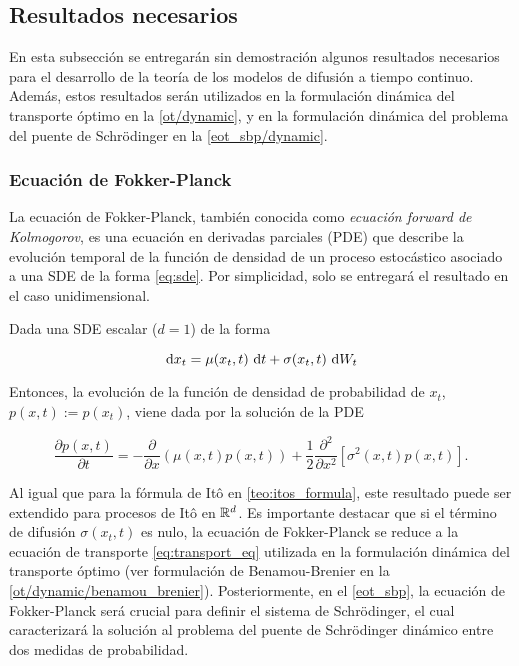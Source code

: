 \subsection{Resultados necesarios}

En esta subsección se entregarán sin demostración algunos resultados necesarios para el desarrollo de la teoría de los modelos de difusión a tiempo continuo. Además, estos resultados serán  utilizados en la formulación dinámica del transporte óptimo en la \autoref{ot/dynamic}, y en la formulación dinámica del problema del puente de Schrödinger en la \autoref{eot_sbp/dynamic}.

\subsubsection{Ecuación de Fokker-Planck}

La ecuación de Fokker-Planck, también conocida como \textit{ecuación forward de Kolmogorov}, es una ecuación en derivadas parciales (PDE)  que describe la evolución temporal de la función de densidad de un proceso estocástico asociado a una SDE de la forma \eqref{eq:sde}. Por simplicidad, solo se entregará el resultado en el caso unidimensional.

\begin{teo}
    \label{teo:fokker_planck}
    Dada una SDE escalar ($d=1$) de la forma

    \begin{equation*}
        \,\operatorname{d}\! x_t = \mu(x_t,t)\,\operatorname{d}\! t + \sigma(x_t,t)\,\operatorname{d}\! W_t
    \end{equation*}

    Entonces, la evolución de la función de densidad de probabilidad de $x_t$, $p(x,t) := p(x_t)$, viene dada por la solución de la PDE

    \begin{equation}
        \label{eq:fokker_planck}
        \frac{\partial p(x,t)}{\partial t} = -\frac{\partial}{\partial x} (\mu(x, t) p(x, t)) + \frac{1}{2} \frac{\partial^2}{\partial x^2} [\sigma^2(x, t) p(x, t)].
    \end{equation}

\end{teo}

Al igual que para la fórmula de Itô en \eqref{teo:itos_formula}, este resultado puede ser extendido para procesos de Itô en $\mathbb{R}^d$. Es importante destacar que si el término de difusión $\sigma(x_t,t)$ es nulo, la ecuación de Fokker-Planck se reduce a la ecuación de transporte \eqref{eq:transport_eq} utilizada en la formulación dinámica del transporte óptimo (ver formulación de Benamou-Brenier en la \autoref{ot/dynamic/benamou_brenier}). Posteriormente, en el \autoref{eot_sbp}, la ecuación de Fokker-Planck será crucial para definir el sistema de Schrödinger, el cual caracterizará la solución al problema del puente de Schrödinger dinámico entre dos medidas de probabilidad.

